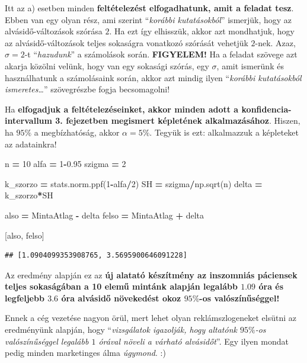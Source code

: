 \documentclass[
]{book}
\newenvironment{Shaded}{\begin{snugshade}}{\end{snugshade}}
\newcommand{\DecValTok}[1]{\textcolor[rgb]{0.00,0.00,0.81}{#1}}
\newcommand{\FloatTok}[1]{\textcolor[rgb]{0.00,0.00,0.81}{#1}}
\newcommand{\NormalTok}[1]{#1}
\newcommand{\OperatorTok}[1]{\textcolor[rgb]{0.81,0.36,0.00}{\textbf{#1}}}
\begin{document}
Itt az a) esetben minden \textbf{feltételezést elfogadhatunk, amit a feladat tesz}. Ebben van egy olyan rész, ami szerint ``\emph{korábbi kutatásokból}'' ismerjük, hogy az alvásidő-változások szórása \(2\). Ha ezt így elhisszük, akkor azt mondhatjuk, hogy az alvásidő-változások teljes sokaságra vonatkozó szórását vehetjük \(2\)-nek. Azaz, \(\sigma=2\)-t ``\emph{hazudunk}'' a számolások során.
\textbf{FIGYELEM!} Ha a feladat szövege azt akarja közölni velünk, hogy van egy sokasági szórás, egy \(\sigma\), amit ismerünk és használhatunk a számolásaink során, akkor azt mindig ilyen ``\emph{korábbi kutatásokból ismeretes\ldots{}}'' szövegrészbe fogja becsomagolni!

Ha \textbf{elfogadjuk a feltételezéseinket, akkor minden adott a konfidencia-intervallum 3. fejezetben megismert képletének alkalmazásához}. Hiszen, ha \(95\%\) a megbízhatóság, akkor \(\alpha=5\%\). Tegyük is ezt: alkalmazzuk a képleteket az adatainkra!

\begin{Shaded}
\begin{Highlighting}[]
\NormalTok{n }\OperatorTok{=} \DecValTok{10}
\NormalTok{alfa }\OperatorTok{=} \DecValTok{1}\OperatorTok{{-}}\FloatTok{0.95}
\NormalTok{szigma }\OperatorTok{=} \DecValTok{2}

\NormalTok{k\_szorzo }\OperatorTok{=}\NormalTok{ stats.norm.ppf(}\DecValTok{1}\OperatorTok{{-}}\NormalTok{alfa}\OperatorTok{/}\DecValTok{2}\NormalTok{)}
\NormalTok{SH }\OperatorTok{=}\NormalTok{ szigma}\OperatorTok{/}\NormalTok{np.sqrt(n)}
\NormalTok{delta }\OperatorTok{=}\NormalTok{ k\_szorzo}\OperatorTok{*}\NormalTok{SH}

\NormalTok{also }\OperatorTok{=}\NormalTok{ MintaAtlag }\OperatorTok{{-}}\NormalTok{ delta}
\NormalTok{felso }\OperatorTok{=}\NormalTok{ MintaAtlag }\OperatorTok{+}\NormalTok{ delta}

\NormalTok{[also, felso]}
\end{Highlighting}
\end{Shaded}

\begin{verbatim}
## [1.0904099353908765, 3.5695900646091228]
\end{verbatim}

Az eredmény alapján ez az \textbf{új alatató készítmény az inszomniás páciensek teljes sokaságában a 10 elemű mintánk alapján legalább \(1.09\) óra és legfeljebb \(3.6\) óra alvásidő növekedést okoz \(95\%\)-os valószínűséggel!}

Ennek a cég vezetése nagyon örül, mert lehet olyan reklámszlogeneket elsütni az eredményünk alapján, hogy ``\emph{vizsgálatok igazolják, hogy altatónk \(95\%\)-os valószínűséggel legalább \(1\) órával növeli a várható alvásidőt}''. Egy ilyen mondat pedig minden marketinges álma \emph{úgymond}. :)
\end{document}
